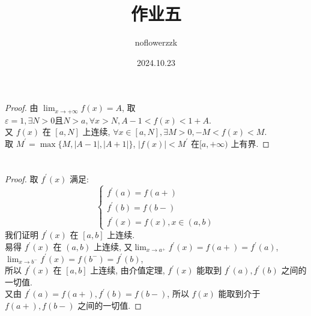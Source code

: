 \documentclass{article}
\title{作业五}
\author{noflowerzzk}
\date{2024.10.23}
\begin{document}
\maketitle

\section{}

\begin{proof}
    由 $\lim_{x \to +\infty}f(x) = A$, 取$\varepsilon = 1, \exists N > 0 \text{且} N > a, \forall x > N, A - 1 < f(x) < 1 + A$. \\
    又 $f(x)$ 在 $[a, N]$ 上连续, $\forall x \in [a, N], \exists M > 0, -M < f(x) < M$. \\
    取 $M^\prime = \max \{M, \left\lvert A - 1\right\rvert , \left\lvert A + 1\right\rvert \}$, $\left\lvert f(x)\right\rvert  < M^\prime$ 在$[a, + \infty)$ 上有界.
\end{proof}

\section{}

\begin{proof}
    取 $f^\prime(x)$ 满足: 
    \[
    \begin{cases}
        f^\prime(a) = f(a+) \\
        f^\prime(b) = f(b-) \\
        f^\prime(x) = f(x), x \in (a, b)
    \end{cases}
    \]
    我们证明 $f^\prime(x)$ 在 $[a, b]$ 上连续. \\
    易得 $f^\prime(x)$ 在 $(a, b)$ 上连续, 
    又$\lim_{x \to a^+}f^\prime(x) = f(a+) = f^\prime(a)$, $\lim_{x \to b^-}f^\prime(x) = f(b^-) = f^\prime(b)$, \\
    所以 $f^\prime(x)$ 在 $[a, b]$ 上连续, 由介值定理, $f^\prime(x)$ 能取到 $f^\prime(a), f^\prime(b)$ 之间的一切值. \\
    又由 $f^\prime(a) = f(a+), f^\prime(b) = f(b-)$, 所以 $f(x)$ 能取到介于 $f(a+), f(b-)$ 之间的一切值. 
\end{proof}

\section{}
\end{document}
